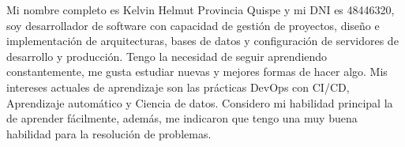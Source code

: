 
\begin{minipage}[t]{0.4\textwidth} %
	\vspace{-\baselineskip} %
	Mi nombre completo es Kelvin Helmut Provincia Quispe y mi DNI es 48446320, soy desarrollador de software con capacidad de gestión de proyectos, diseño e implementación de arquitecturas, bases de datos y configuración de servidores de desarrollo y producción. Tengo la necesidad de seguir aprendiendo constantemente, me gusta estudiar nuevas y mejores formas de hacer algo. Mis intereses actuales de aprendizaje son las prácticas DevOps con CI/CD, Aprendizaje automático y Ciencia de datos. Considero mi habilidad principal la de aprender fácilmente, además, me indicaron que tengo una muy buena habilidad para la resolución de problemas.
\end{minipage}
\hfill %
\begin{minipage}[t]{0.5\textwidth} %
	\vspace{-\baselineskip} %
	\begin{barchart}{5.5}
	\end{barchart}
	
	\vspace{5mm}
	\begin{center}
    \end{center}
\end{minipage}

